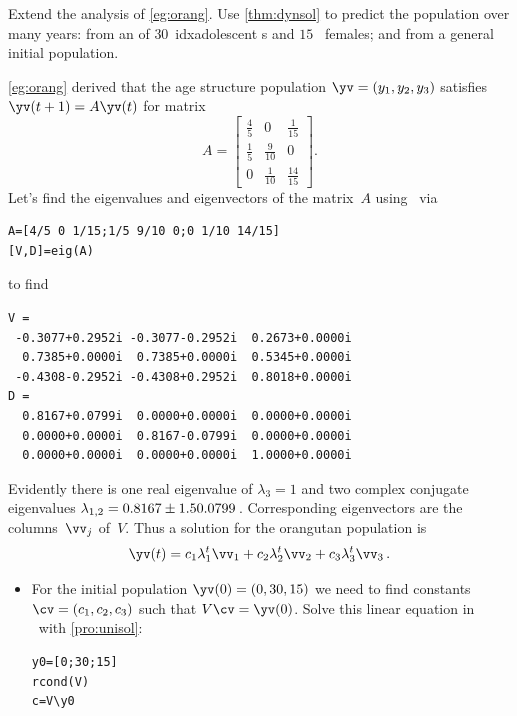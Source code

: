 \begin{example} \label{eg:orangs}
Extend the  analysis of \autoref{eg:orang}. 
Use \autoref{thm:dynsol} to predict the population over many years: from an  of \(30\)~idx{adolescent} s and \(15\)~ females; and from a general initial population.
\begin{solution} 
\autoref{eg:orang} derived that the age structure population \(\yv=(y_1,y_2,y_3)\) satisfies \(\yv(t+1)=A\yv(t)\) for matrix
\begin{equation*}
A=\begin{bmatrix} \frac45&0&\frac1{15}
\\\frac15&\frac9{10}&0
\\0&\frac1{10}&\frac{14}{15} \end{bmatrix}.
\end{equation*}
Let's find the eigenvalues and eigenvectors of the matrix~\(A\) using \script\ via
\begin{verbatim}
A=[4/5 0 1/15;1/5 9/10 0;0 1/10 14/15]
[V,D]=eig(A)
\end{verbatim}
\setbox\ajrqrbox\hbox{}%
\marginpar{\usebox{\ajrqrbox}}%
to find
\begin{verbatim}
V =
 -0.3077+0.2952i -0.3077-0.2952i  0.2673+0.0000i
  0.7385+0.0000i  0.7385+0.0000i  0.5345+0.0000i
 -0.4308-0.2952i -0.4308+0.2952i  0.8018+0.0000i
D =
  0.8167+0.0799i  0.0000+0.0000i  0.0000+0.0000i
  0.0000+0.0000i  0.8167-0.0799i  0.0000+0.0000i
  0.0000+0.0000i  0.0000+0.0000i  1.0000+0.0000i
\end{verbatim}
Evidently there is one real eigenvalue of \(\lambda_3=1\) and two complex conjugate eigenvalues \(\lambda_{1,2}=0.8167\pm 1.50.0799\)\,.
Corresponding eigenvectors are the columns~\(\vv_j\) of~\(V\).
Thus a solution for the orangutan population is
\begin{equation*}
\yv(t)=c_1\lambda_1^t\vv_1+c_2\lambda_2^t\vv_2+c_3\lambda_3^t\vv_3\,.
\end{equation*}
\begin{itemize}
\item For the initial population \(\yv(0)=(0,30,15)\) we need to find constants \(\cv=(c_1,c_2,c_3)\) such that \(V\cv=\yv(0)\).
Solve this linear equation in \script\ with \autoref{pro:unisol}:
\begin{verbatim}
y0=[0;30;15]
rcond(V)
c=V\y0
\end{verbatim}

\end{itemize}
\end{solution}
\end{example}
